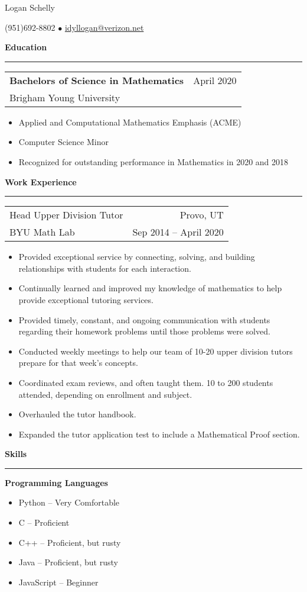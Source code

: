 \documentclass{article}
\newenvironment{compactItemize}{
  \begin{itemize}[itemsep=0ex, parsep=0ex, partopsep=0ex, topsep= -7pt]
}{
  \end{itemize}
}
\newcommand{\jobInfo}[4]{
  \begingroup
  \setlength{\tabcolsep}{0ex}
  \begin{tabularx}{\linewidth}{X r}
    #1 & %
    #2\\ %
    #3 & %
    #4   %
  \end{tabularx}%
  \endgroup%
}
\newcommand{\degree}[4]{
  \jobInfo{\textbf{#1}}{#2}{#3}{#4}
}
\begin{document}
\begin{center}
{\Large Logan Schelly} %

(951)\phantom{-}692-8802 %
$\bullet$ %
\href{mailto:idyllogan@verizon.net}{idyllogan@verizon.net} %
\end{center}
\textbf{Education}
\smallskip
\hrule

\degree{Bachelors of Science in Mathematics}{April 2020}{Brigham Young University}{}
%
\begin{compactItemize}
  \item Applied and Computational Mathematics Emphasis (ACME)
  \item Computer Science Minor
  \item Recognized for outstanding performance in Mathematics in 2020 and 2018
\end{compactItemize}
\medskip

\textbf{Work Experience}
\smallskip
\hrule

\jobInfo{Head Upper Division Tutor}{Provo, UT}{BYU Math Lab}{Sep 2014 -- April 2020}
\begin{compactItemize}
  \item Provided exceptional service by connecting, solving, and building relationships with students for each interaction.
  \item Continually learned and improved my knowledge of mathematics to help provide exceptional tutoring services.
  \item Provided timely, constant, and ongoing communication with students regarding their homework problems until those problems were solved.
  \item Conducted weekly meetings to help our team of 10-20 upper division tutors prepare for that week's concepts.
  \item Coordinated exam reviews, and often taught them.  10 to 200 students attended, depending on enrollment and subject.
  \item Overhauled the tutor handbook.
  \item Expanded the tutor application test to include a Mathematical Proof section.
\end{compactItemize}
\medskip

\textbf{Skills}
\smallskip
\hrule
\textbf{Programming Languages}
\begin{multicols}{2}
\begin{compactItemize}
  \item Python -- Very Comfortable
  \item C -- Proficient
  \item C++ -- Proficient, but rusty
  \item Java -- Proficient, but rusty
  \item JavaScript -- Beginner
\end{compactItemize}
\end{multicols}
\end{document}
